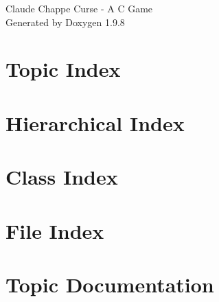 \documentclass[twoside]{book}
\newcommand{\+}{\discretionary{\mbox{\scriptsize$\hookleftarrow$}}{}{}}
\newcommand{\clearemptydoublepage}{%
    \newpage{\pagestyle{empty}\cleardoublepage}%
  }
\begin{document}
  \raggedbottom
    \hypersetup{pageanchor=false,
                bookmarksnumbered=true,
                pdfencoding=unicode
               }
  \begin{titlepage}
  \vspace*{7cm}
  \begin{center}%
  {\Large Claude Chappe\textquotesingle{} Curse -\/ A C Game}\\
  \vspace*{1cm}
  {\large Generated by Doxygen 1.9.8}\\
  \end{center}
  \end{titlepage}
  \clearemptydoublepage
  \tableofcontents
  \clearemptydoublepage
  \hypersetup{pageanchor=true}



\chapter{Topic Index}

\chapter{Hierarchical Index}

\chapter{Class Index}

\chapter{File Index}

\chapter{Topic Documentation}





























\end{document}
